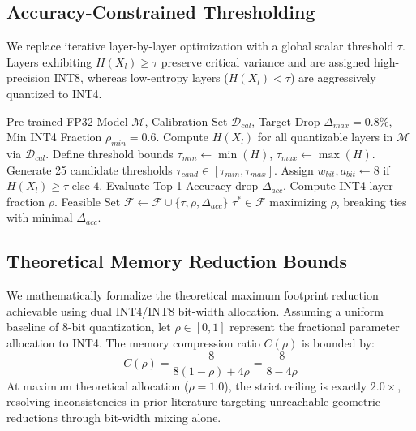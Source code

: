 \documentclass[journal]{IEEEtran}
\begin{document}
\subsection{Accuracy-Constrained Thresholding}
We replace iterative layer-by-layer optimization with a global scalar threshold $\tau$. Layers exhibiting $H(X_l) \ge \tau$ preserve critical variance and are assigned high-precision INT8, whereas low-entropy layers ($H(X_l) < \tau$) are aggressively quantized to INT4. 

\begin{algorithm}[h]
\caption{Entropy-Driven Bit-Width Assignment}
\label{alg:thresholding}
\begin{algorithmic}[1]
\REQUIRE Pre-trained FP32 Model $\mathcal{M}$, Calibration Set $\mathcal{D}_{cal}$, Target Drop $\Delta_{max} = 0.8\%$, Min INT4 Fraction $\rho_{min} = 0.6$.
\STATE Compute $H(X_l)$ for all quantizable layers in $\mathcal{M}$ via $\mathcal{D}_{cal}$.
\STATE Define threshold bounds $\tau_{min} \leftarrow \min(H)$, $\tau_{max} \leftarrow \max(H)$.
\STATE Generate 25 candidate thresholds $\tau_{cand} \in [\tau_{min}, \tau_{max}]$.
    \STATE Assign $w_{bit}, a_{bit} \leftarrow 8$ if $H(X_l) \ge \tau$ else $4$.
    \STATE Evaluate Top-1 Accuracy drop $\Delta_{acc}$.
    \STATE Compute INT4 layer fraction $\rho$.
        \STATE Feasible Set $\mathcal{F} \leftarrow \mathcal{F} \cup \{\tau, \rho, \Delta_{acc}\}$
    \ENDIF
\ENDFOR
\RETURN $\tau^* \in \mathcal{F}$ maximizing $\rho$, breaking ties with minimal $\Delta_{acc}$.
\end{algorithmic}
\end{algorithm}

\subsection{Theoretical Memory Reduction Bounds}
We mathematically formalize the theoretical maximum footprint reduction achievable using dual INT4/INT8 bit-width allocation. Assuming a uniform baseline of 8-bit quantization, let $\rho \in [0,1]$ represent the fractional parameter allocation to INT4. The memory compression ratio $C(\rho)$ is bounded by:
\begin{equation}
    C(\rho) = \frac{8}{8(1-\rho) + 4\rho} = \frac{8}{8 - 4\rho}
\end{equation}
At maximum theoretical allocation ($\rho = 1.0$), the strict ceiling is exactly $2.0\times$, resolving inconsistencies in prior literature targeting unreachable geometric reductions through bit-width mixing alone.
\end{document}
